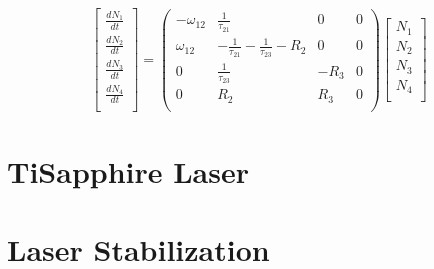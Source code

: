 \documentclass[prb,preprint]{revtex4-1}
\begin{document}
\begin{equation}
\label{RateEqMatrix}
\begin{bmatrix}
	\frac{dN_1}{dt} \\
	\frac{dN_2}{dt} \\
	\frac{dN_3}{dt} \\
	\frac{dN_4}{dt} \\
\end{bmatrix}
=
\begin{pmatrix}
	-\omega_{12} & \frac{1}{\tau_{21}}  & 0 &  0   \\
	\omega_{12}  & -\frac{1}{\tau_{21}}- \frac{1}{\tau_{23}}-R_2 & 0 & 0 \\
	0  &  \frac{1}{\tau_{23}}  & - R_3 & 0 \\
	0  &  R_2  & R_3 & 0  \\
\end{pmatrix}
\begin{bmatrix}
	N_1 \\
	N_2 \\
	N_3 \\
	N_4 \\
\end{bmatrix}
\end{equation}



\section{TiSapphire Laser}


\section{Laser Stabilization}




\begin{thebibliography}{0}



\end{thebibliography}
\end{document}
